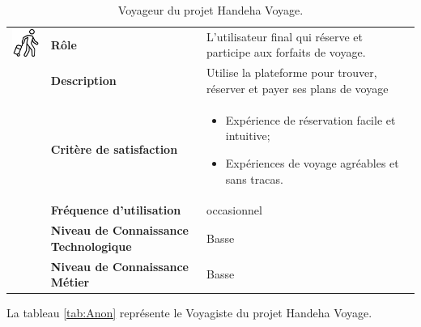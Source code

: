 \documentclass[12pt]{report}
\begin{document}
				\begin{table}[h]
				  \centering
				  \caption{Voyageur du projet Handeha Voyage.}
				  \label{tab:Voyageur}
				    \begin{tabular}{|p{3cm}|p{4cm}|p{7cm}|}
					\hline
					\begin{minipage}{3cm}
						\includegraphics[width=2cm]{voyageur.png}
					\end{minipage} & \textbf{Rôle} & L'utilisateur final qui réserve et participe aux forfaits de voyage.\\ \cline{2-3}
							& \textbf{Description} & Utilise la plateforme pour trouver, réserver et payer ses plans de voyage\\ \cline{2-3}
							& \textbf{Critère de satisfaction}& \begin{itemize}
														\item Expérience de réservation facile et intuitive;
														\item Expériences de voyage agréables et sans tracas.
													\end{itemize}\\ \cline{2-3}
							&\textbf{Fréquence d’utilisation} & occasionnel \\  \cline{2-3}
							&\textbf{Niveau de Connaissance Technologique} & Basse \\  \cline{2-3}
							&\textbf{Niveau de Connaissance Métier} & Basse \\ 
					\hline
				    \end{tabular}
				\end{table}
				\FloatBarrier				

				La tableau \ref{tab:Anon} représente le Voyagiste du projet Handeha Voyage.
\end{document}
